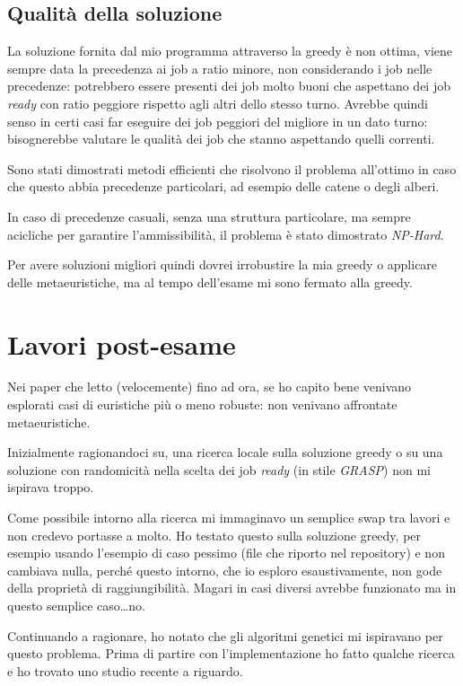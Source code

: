 \documentclass[12pt, letterpaper]{article}
\begin{document}
\subsection{Qualità della soluzione}

La soluzione fornita dal mio programma attraverso la greedy è non ottima, viene sempre data la precedenza ai job a ratio minore, non considerando i job nelle precedenze: potrebbero essere presenti dei job molto buoni che aspettano dei job \textit{ready} con ratio peggiore rispetto agli altri dello stesso turno. Avrebbe quindi senso in certi casi far eseguire dei job peggiori del migliore in un dato turno: bisognerebbe valutare le qualità dei job che stanno aspettando quelli correnti.

Sono stati dimostrati metodi efficienti che risolvono il problema all'ottimo in caso che questo abbia precedenze particolari, ad esempio delle catene o degli alberi\cite{Baev}.

In caso di precedenze casuali, senza una struttura particolare, ma sempre acicliche per garantire l'ammissibilità, il problema è stato dimostrato \textit{NP-Hard}\cite{Baev}\cite{Lenstra}.

Per avere soluzioni migliori quindi dovrei irrobustire la mia greedy o applicare delle metaeuristiche, ma al tempo dell'esame mi sono fermato alla greedy.

\section{Lavori post-esame}

Nei paper che letto (velocemente) fino ad ora, se ho capito bene venivano esplorati casi di euristiche più o meno robuste: non venivano affrontate metaeuristiche.

Inizialmente ragionandoci su, una ricerca locale sulla soluzione greedy o su una soluzione con randomicità nella scelta dei job \textit{ready} (in stile \textit{GRASP}) non mi ispirava troppo.

Come possibile intorno alla ricerca mi immaginavo un semplice swap tra lavori e non credevo portasse a molto. Ho testato questo sulla soluzione greedy, per esempio usando l'esempio di caso pessimo (file che riporto nel repository) e non cambiava nulla, perché questo intorno, che io esploro esaustivamente, non gode della proprietà di raggiungibilità. Magari in casi diversi avrebbe funzionato ma in questo semplice caso\ldots no.

Continuando a ragionare, ho notato che gli algoritmi genetici mi ispiravano per questo problema. Prima di partire con l'implementazione ho fatto qualche ricerca e ho trovato uno studio recente a riguardo\cite{Zaidi}.
\end{document}
